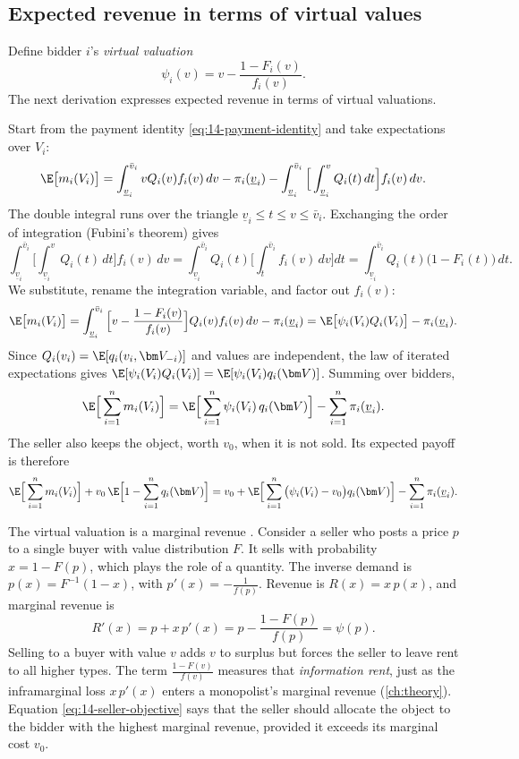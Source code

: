 \subsection{Expected revenue in terms of virtual values}\label{sec:14-optimal-virtual}

Define bidder $i$'s \emph{virtual valuation}
\begin{equation}\label{eq:14-psi}
\psi_i(v)=v-\frac{1-F_i(v)}{f_i(v)}.
\end{equation}
The next derivation expresses expected revenue in terms of virtual valuations.

Start from the payment identity \eqref{eq:14-payment-identity} and take expectations over $V_i$:
\[
\E\big[m_i(V_i)\big]=\int_{\underline v_i}^{\bar v_i}vQ_i(v)f_i(v)\,dv-\pi_i(\underline v_i)-\int_{\underline v_i}^{\bar v_i}\Big[\int_{\underline v_i}^{v}Q_i(t)\,dt\Big]f_i(v)\,dv.
\]
The double integral runs over the triangle $\underline v_i\le t\le v\le\bar v_i$. Exchanging the order of integration (Fubini's theorem) gives
\[
\int_{\underline v_i}^{\bar v_i}\Big[\int_{\underline v_i}^{v}Q_i(t)\,dt\Big]f_i(v)\,dv=\int_{\underline v_i}^{\bar v_i}Q_i(t)\Big[\int_{t}^{\bar v_i}f_i(v)\,dv\Big]dt=\int_{\underline v_i}^{\bar v_i}Q_i(t)\big(1-F_i(t)\big)\,dt.
\]
We substitute, rename the integration variable, and factor out $f_i(v)$:
\[
\E\big[m_i(V_i)\big]=\int_{\underline v_i}^{\bar v_i}\Big[v-\frac{1-F_i(v)}{f_i(v)}\Big]Q_i(v)f_i(v)\,dv-\pi_i(\underline v_i)=\E\big[\psi_i(V_i)Q_i(V_i)\big]-\pi_i(\underline v_i).
\]
Since $Q_i(v_i)=\E[q_i(v_i,\bm V_{-i})]$ and values are independent, the law of iterated expectations gives $\E[\psi_i(V_i)Q_i(V_i)]=\E[\psi_i(V_i)q_i(\bm V)]$. Summing over bidders,
\begin{equation}\label{eq:14-revenue-psi}
\E\Big[\sum_{i=1}^n m_i(V_i)\Big]=\E\Big[\sum_{i=1}^n\psi_i(V_i)\,q_i(\bm V)\Big]-\sum_{i=1}^n\pi_i(\underline v_i).
\end{equation}
The seller also keeps the object, worth $v_0$, when it is not sold. Its expected payoff is therefore
\begin{equation}\label{eq:14-seller-objective}
\E\Big[\sum_{i=1}^n m_i(V_i)\Big]+v_0\,\E\Big[1-\sum_{i=1}^n q_i(\bm V)\Big]=v_0+\E\Big[\sum_{i=1}^n\big(\psi_i(V_i)-v_0\big)q_i(\bm V)\Big]-\sum_{i=1}^n\pi_i(\underline v_i).
\end{equation}

The virtual valuation is a marginal revenue \citep{BulowRoberts1989}. Consider a seller who posts a price $p$ to a single buyer with value distribution $F$. It sells with probability $x=1-F(p)$, which plays the role of a quantity. The inverse demand is $p(x)=F^{-1}(1-x)$, with $p'(x)=-\frac{1}{f(p)}$. Revenue is $R(x)=x\,p(x)$, and marginal revenue is
\[
R'(x)=p+x\,p'(x)=p-\frac{1-F(p)}{f(p)}=\psi(p).
\]
Selling to a buyer with value $v$ adds $v$ to surplus but forces the seller to leave rent to all higher types. The term $\frac{1-F(v)}{f(v)}$ measures that \emph{information rent}, just as the inframarginal loss $x\,p'(x)$ enters a monopolist's marginal revenue (\cref{ch:theory}). Equation \eqref{eq:14-seller-objective} says that the seller should allocate the object to the bidder with the highest marginal revenue, provided it exceeds its marginal cost $v_0$.

